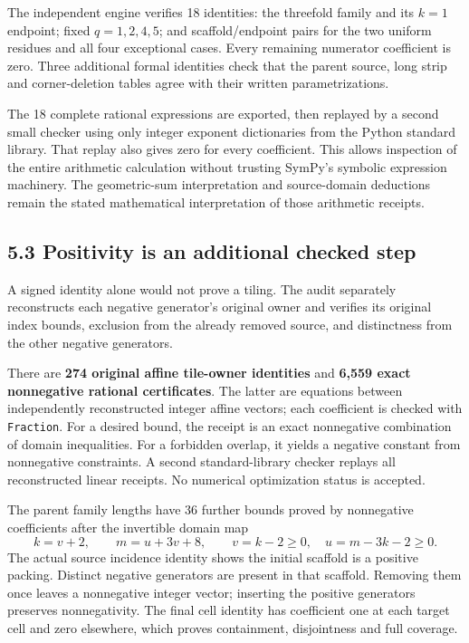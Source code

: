 \documentclass[
  11pt,
]{article}
\begin{document}
The independent engine verifies 18 identities: the threefold family and
its \(k=1\) endpoint; fixed \(q=1,2,4,5\); and scaffold/endpoint pairs
for the two uniform residues and all four exceptional cases. Every
remaining numerator coefficient is zero. Three additional formal
identities check that the parent source, long strip and corner-deletion
tables agree with their written parametrizations.

The 18 complete rational expressions are exported, then replayed by a
second small checker using only integer exponent dictionaries from the
Python standard library. That replay also gives zero for every
coefficient. This allows inspection of the entire arithmetic calculation
without trusting SymPy's symbolic expression machinery. The
geometric-sum interpretation and source-domain deductions remain the
stated mathematical interpretation of those arithmetic receipts.

\subsection{5.3 Positivity is an additional checked
step}\label{positivity-is-an-additional-checked-step}

A signed identity alone would not prove a tiling. The audit separately
reconstructs each negative generator's original owner and verifies its
original index bounds, exclusion from the already removed source, and
distinctness from the other negative generators.

There are \textbf{274 original affine tile-owner identities} and
\textbf{6,559 exact nonnegative rational certificates}. The latter are
equations between independently reconstructed integer affine vectors;
each coefficient is checked with \texttt{Fraction}. For a desired bound,
the receipt is an exact nonnegative combination of domain inequalities.
For a forbidden overlap, it yields a negative constant from nonnegative
constraints. A second standard-library checker replays all reconstructed
linear receipts. No numerical optimization status is accepted.

The parent family lengths have 36 further bounds proved by nonnegative
coefficients after the invertible domain map \[
k=v+2,\qquad m=u+3v+8,
\qquad v=k-2\ge0,\quad u=m-3k-2\ge0.
\] The actual source incidence identity shows the initial scaffold is a
positive packing. Distinct negative generators are present in that
scaffold. Removing them once leaves a nonnegative integer vector;
inserting the positive generators preserves nonnegativity. The final
cell identity has coefficient one at each target cell and zero
elsewhere, which proves containment, disjointness and full coverage.
\end{document}
